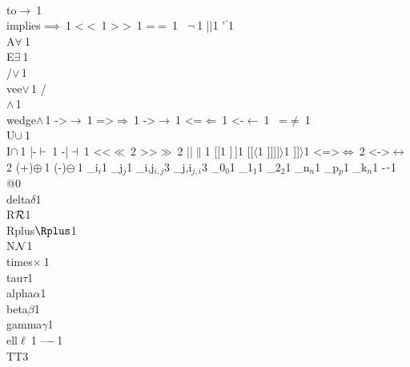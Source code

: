 {{        {\\to}{{$\to\ $}}1
        {\\implies}{{$\implies\ $}}1
        {<}{{$<\ $}}1
        {>}{{$>\ $}}1
        {=}{{$=\ $}}1
        {~}{{$\neg\ $}}1
        {|}{{$\mid$}}1
        {'}{{$^\prime$}}1
        {\\A}{{$\forall\ $}}1
        {\\E}{{$\exists\ $}}1
        {\\/}{{$\vee\,$}}1
        {\\vee}{{$\vee\,$}}1
        {/\\}{{$\wedge\,$}}1
        {\\wedge}{{$\wedge\,$}}1
        {->}{{$\rightarrow\ $}}1
        {=>}{{$\Rightarrow\ $}}1
        {->}{{$\rightarrow\ $}}1
        {<=}{{$\Leftarrow\ $}}1
        {<-}{{$\leftarrow\ $}}1
        {~=}{{$\neq\ $}}1
        {\\U}{{$\cup\ $}}1
        {\\I}{{$\cap\ $}}1
        {|-}{{$\vdash\ $}}1
        {-|}{{$\dashv\ $}}1
        {<<}{{$\ll\ $}}2
        {>>}{{$\gg\ $}}2
        {||}{{$\|$}}1
        {[}{{$[$}}1
        {]}{{$\,]$}}1
        {[[}{{$\langle$}}1
        {]]]}{{$]\rangle$}}1
        {]]}{{$\rangle$}}1
        {<=>}{{$\Leftrightarrow\ $}}2
        {<->}{{$\leftrightarrow\ $}}2
        {(+)}{{$\oplus\ $}}1
        {(-)}{{$\ominus\ $}}1
        {_i}{{$_{i}$}}1
        {_j}{{$_{j}$}}1
        {_{i,j}}{{$_{i,j}$}}3
        {_{j,i}}{{$_{j,i}$}}3
        {_0}{{$_0$}}1
        {_1}{{$_1$}}1
        {_2}{{$_2$}}1
        {_n}{{$_n$}}1
        {_p}{{$_p$}}1
        {_k}{{$_n$}}1
        {-}{{$\ms{-}$}}1
        {@}{{}}0
        {\\delta}{{$\delta$}}1
        {\\R}{{${\mathcal R}$}}1
        {\\Rplus}{{$\Rplus$}}1
        {\\N}{{${\mathcal N}$}}1
        {\\times}{{$\times\ $}}1
        {\\tau}{{$\tau$}}1
        {\\alpha}{{$\alpha$}}1
        {\\beta}{{$\beta$}}1
        {\\gamma}{{$\gamma$}}1
        {\\ell}{{$\ell\ $}}1
        {--}{{$-\ $}}1
        {\\TT}{{\hspace{1.5em}}}3
      }



}
